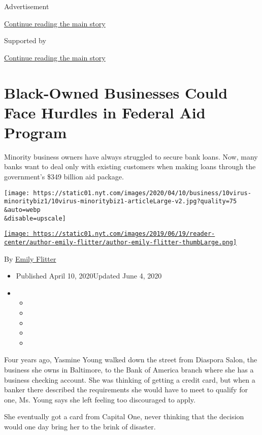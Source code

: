 Advertisement

\protect\hyperlink{after-top}{Continue reading the main story}

Supported by

\protect\hyperlink{after-sponsor}{Continue reading the main story}

\hypertarget{black-owned-businesses-could-face-hurdles-in-federal-aid-program}{%
\section{Black-Owned Businesses Could Face Hurdles in Federal Aid
Program}\label{black-owned-businesses-could-face-hurdles-in-federal-aid-program}}

Minority business owners have always struggled to secure bank loans.
Now, many banks want to deal only with existing customers when making
loans through the government's \$349 billion aid package.

\texttt{[image: https://static01.nyt.com/images/2020/04/10/business/10virus-minoritybiz1/10virus-minoritybiz1-articleLarge-v2.jpg?quality=75\\\&auto=webp\\\&disable=upscale]}

\href{https://www.nytimes.com/by/emily-flitter}{\texttt{[image: https://static01.nyt.com/images/2019/06/19/reader-center/author-emily-flitter/author-emily-flitter-thumbLarge.png]}}

By \href{https://www.nytimes.com/by/emily-flitter}{Emily Flitter}

\begin{itemize}
\item
  Published April 10, 2020Updated June 4, 2020
\item
  \begin{itemize}
  \item
  \item
  \item
  \item
  \item
  \end{itemize}
\end{itemize}

Four years ago, Yasmine Young walked down the street from Diaspora
Salon, the business she owns in Baltimore, to the Bank of America branch
where she has a business checking account. She was thinking of getting a
credit card, but when a banker there described the requirements she
would have to meet to qualify for one, Ms. Young says she left feeling
too discouraged to apply.

She eventually got a card from Capital One, never thinking that the
decision would one day bring her to the brink of disaster.

